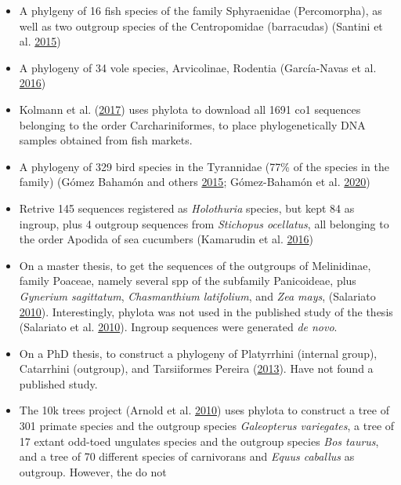\documentclass[]{article}
\begin{document}
\begin{enumerate}
\begin{itemize}
  \item
    A phylgeny of 16 fish species of the family Sphyraenidae (Percomorpha), as well
    as two outgroup species of the Centropomidae (barracudas) (Santini et al. \protect\hyperlink{ref-santini2015first}{2015})
  \item
    A phylogeny of 34 vole species, Arvicolinae, Rodentia (García-Navas et al. \protect\hyperlink{ref-garcia2016role}{2016})
  \item
    Kolmann et al. (\protect\hyperlink{ref-kolmann2017dna}{2017}) uses phylota to download all 1691 co1 sequences belonging to
    the order Carchariniformes, to place phylogenetically DNA samples obtained from
    fish markets.
  \item
    A phylogeny of 329 bird species in the Tyrannidae (77\% of the species in the
    family) (Gómez Bahamón and others \protect\hyperlink{ref-gomez2015behavioral}{2015}; Gómez-Bahamón et al. \protect\hyperlink{ref-gomez2020speciation}{2020})
  \item
    Retrive 145 sequences registered as \emph{Holothuria} species, but kept 84 as ingroup,
    plus 4 outgroup sequences from \emph{Stichopus ocellatus}, all belonging to the order
    Apodida of sea cucumbers (Kamarudin et al. \protect\hyperlink{ref-kamarudin2016phylogenetic}{2016})
  \item
    On a master thesis, to get the sequences of the outgroups of Melinidinae, family Poaceae, namely several spp of the
    subfamily Panicoideae, plus \emph{Gynerium sagittatum}, \emph{Chasmanthium latifolium},
    and \emph{Zea mays}, (Salariato \protect\hyperlink{ref-salariato2010filogenia}{2010}). Interestingly, phylota was not used
    in the published study of the thesis (Salariato et al. \protect\hyperlink{ref-salariato2010molecular}{2010}). Ingroup sequences were generated \emph{de novo}.
  \item
    On a PhD thesis, to construct a phylogeny of Platyrrhini (internal group),
    Catarrhini (outgroup), and Tarsiiformes Pereira (\protect\hyperlink{ref-pereira2013padroes}{2013}). Have not found a published study.
  \item
    The 10k trees project (Arnold et al. \protect\hyperlink{ref-arnold201010ktrees}{2010}) uses phylota to construct a tree of 301 primate species
    and the outgroup species \emph{Galeopterus variegates}, a tree of 17 extant odd-toed
    ungulates species and the outgroup species \emph{Bos taurus}, and a tree of 70 different
    species of carnivorans and \emph{Equus caballus} as outgroup. However, the do not

\end{itemize}
\end{enumerate}
\end{document}
